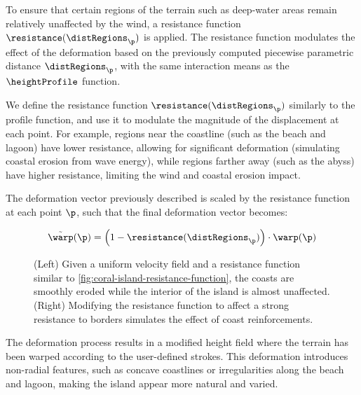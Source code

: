 To ensure that certain regions of the terrain such as deep-water areas remain relatively unaffected by the wind, a resistance function $\resistance(\distRegions_\p)$ is applied. The resistance function modulates the effect of the deformation based on the previously computed piecewise parametric distance $\distRegions_\p$, with the same interaction means as the $\heightProfile$ function.

We define the resistance function $\resistance(\distRegions_\p)$ similarly to the profile function, and use it to modulate the magnitude of the displacement at each point. For example, regions near the coastline (such as the beach and lagoon) have lower resistance, allowing for significant deformation (simulating coastal erosion from wave energy), while regions farther away (such as the abyss) have higher resistance, limiting the wind and coastal erosion impact.

The deformation vector previously described is scaled by the resistance function at each point $\p$, such that the final deformation vector becomes:

\begin{align}
\Tilde{\warp}(\p) = \left(1 - \resistance(\distRegions_\p) \right) \cdot \warp(\p)
\end{align}


\begin{figure}[H]
\caption{(Left) Given a uniform velocity field and a resistance function similar to \cref{fig:coral-island-resistance-function}, the coasts are smoothly eroded while the interior of the island is almost unaffected. (Right) Modifying the resistance function to affect a strong resistance to borders simulates the effect of coast reinforcements.}
\end{figure}


The deformation process results in a modified height field where the terrain has been warped according to the user-defined strokes. This deformation introduces non-radial features, such as concave coastlines or irregularities along the beach and lagoon, making the island appear more natural and varied.

